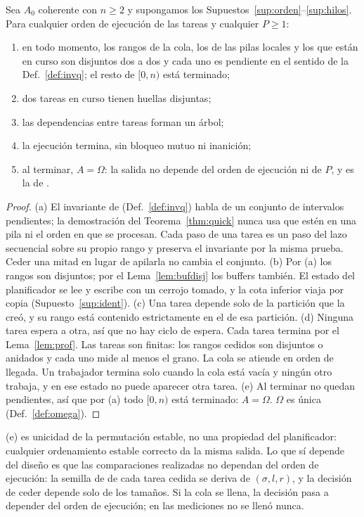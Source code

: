 \begin{teorema}\label{thm:ooo}
Sea $A_0$ coherente con $n\ge2$ y supongamos los
Supuestos~\ref{sup:orden}--\ref{sup:hilos}. Para cualquier orden de ejecución de las
tareas y cualquier $P\ge1$:
\begin{enumerate}[label=(\alph*),nosep]
\item en todo momento, los rangos de la cola, los de las pilas locales y los que están
  en curso son disjuntos dos a dos y cada uno es pendiente en el sentido de la
  Def.~\ref{def:invq}; el resto de $[0,n)$ está terminado;
\item dos tareas en curso tienen huellas disjuntas;
\item las dependencias entre tareas forman un árbol;
\item la ejecución termina, sin bloqueo mutuo ni inanición;
\item al terminar, $A=\Omega$: la salida no depende del orden de ejecución ni de $P$, y
  es la de \SotSort.
\end{enumerate}
\end{teorema}
\begin{proof}
(a) El invariante de \Quick (Def.~\ref{def:invq}) habla de un conjunto de intervalos
pendientes; la demostración del Teorema~\ref{thm:quick} nunca usa que estén en una
pila ni el orden en que se procesan. Cada paso de una tarea es un paso del lazo
secuencial sobre su propio rango y preserva el invariante por la misma prueba. Ceder
una mitad en lugar de apilarla no cambia el conjunto.
(b) Por (a) los rangos son disjuntos; por el Lema~\ref{lem:bufdisj} los buffers
también. El estado del planificador se lee y escribe con un cerrojo tomado, y la cota
inferior viaja por copia (Supuesto~\ref{sup:ident}).
(c) Una tarea depende solo de la partición que la creó, y su rango está contenido
estrictamente en el de esa partición.
(d) Ninguna tarea espera a otra, así que no hay ciclo de espera. Cada tarea termina
por el Lema~\ref{lem:prof}. Las tareas son finitas: los rangos cedidos son disjuntos o
anidados y cada uno mide al menos el grano. La cola se atiende en orden de llegada.
Un trabajador termina solo cuando la cola está vacía y ningún otro trabaja, y en ese
estado no puede aparecer otra tarea.
(e) Al terminar no quedan pendientes, así que por (a) todo $[0,n)$ está terminado:
$A=\Omega$. $\Omega$ es única (Def.~\ref{def:omega}).
\end{proof}

\begin{observacion}
(e) es unicidad de la permutación estable, no una propiedad del planificador: cualquier
ordenamiento estable correcto da la misma salida. Lo que sí depende del diseño es que
las comparaciones realizadas no dependan del orden de ejecución: la semilla de
\Aleatorio de cada tarea cedida se deriva de $(\sigma,l,r)$, y la decisión de ceder
depende solo de los tamaños. Si la cola se llena, la decisión pasa a depender del
orden de ejecución; en las mediciones no se llenó nunca.
\end{observacion}

